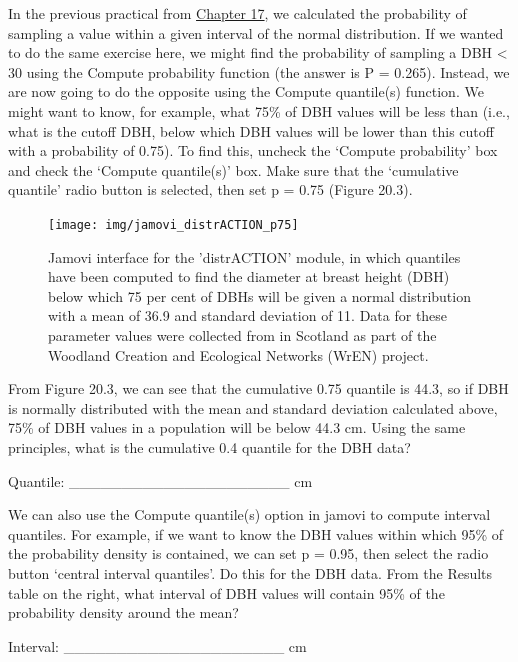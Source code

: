 \documentclass[
]{scrbook}
\begin{document}
In the previous practical from \protect\hyperlink{Chapter_17}{Chapter 17}, we calculated the probability of sampling a value within a given interval of the normal distribution.
If we wanted to do the same exercise here, we might find the probability of sampling a DBH \textless{} 30 using the Compute probability function (the answer is P = 0.265).
Instead, we are now going to do the opposite using the Compute quantile(s) function.
We might want to know, for example, what 75\% of DBH values will be less than (i.e., what is the cutoff DBH, below which DBH values will be lower than this cutoff with a probability of 0.75).
To find this, uncheck the `Compute probability' box and check the `Compute quantile(s)' box.
Make sure that the `cumulative quantile' radio button is selected, then set p = 0.75 (Figure 20.3).

\begin{figure}
\texttt{[image: img/jamovi\_distrACTION\_p75]} \caption{Jamovi interface for the 'distrACTION' module, in which quantiles have been computed to find the diameter at breast height (DBH) below which 75 per cent of DBHs will be given a normal distribution with a mean of 36.9 and standard deviation of 11. Data for these parameter values were collected from in Scotland as part of the Woodland Creation and Ecological Networks (WrEN) project.}\label{fig:unnamed-chunk-90}
\end{figure}

From Figure 20.3, we can see that the cumulative 0.75 quantile is 44.3, so if DBH is normally distributed with the mean and standard deviation calculated above, 75\% of DBH values in a population will be below 44.3 cm.
Using the same principles, what is the cumulative 0.4 quantile for the DBH data?

Quantile: \_\_\_\_\_\_\_\_\_\_\_\_\_\_\_\_\_\_\_\_\_ cm

We can also use the Compute quantile(s) option in jamovi to compute interval quantiles.
For example, if we want to know the DBH values within which 95\% of the probability density is contained, we can set p = 0.95, then select the radio button `central interval quantiles'.
Do this for the DBH data.
From the Results table on the right, what interval of DBH values will contain 95\% of the probability density around the mean?

Interval: \_\_\_\_\_\_\_\_\_\_\_\_\_\_\_\_\_\_\_\_\_ cm
\end{document}
